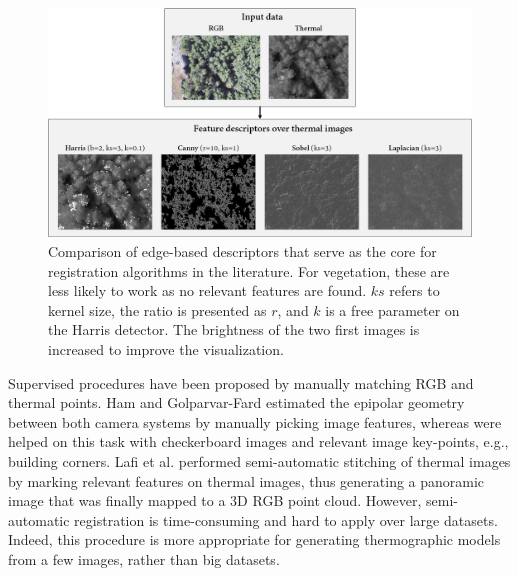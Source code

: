\begin{figure}[!ht]
	\includegraphics[width=\linewidth]{figs/context/feature_detection.png}
	\caption{Comparison of edge-based descriptors that serve as the core for registration algorithms in the literature. For vegetation, these are less likely to work as no relevant features are found. $\textit{ks}$ refers to kernel size, the ratio is presented as $\textit{r}$, and $\textit{k}$ is a free parameter on the Harris detector. The brightness of the two first images is increased to improve the visualization.}
    \label{fig:feature_detection}
\end{figure}
  
Supervised procedures have been proposed by manually matching RGB and thermal points. Ham and Golparvar-Fard \cite{ham_automated_2013} estimated the epipolar geometry between both camera systems by manually picking image features, whereas \cite{huang_combining_2018, macher_combination_2019} were helped on this task with checkerboard images and relevant image key-points, e.g., building corners. Lafi et al. \cite{lafi_3d_2017} performed semi-automatic stitching of thermal images by marking relevant features on thermal images, thus generating a panoramic image that was finally mapped to a 3D RGB point cloud. However, semi-automatic registration is time-consuming and hard to apply over large datasets. Indeed, this procedure is more appropriate for generating thermographic models from a few images, rather than big datasets. 


